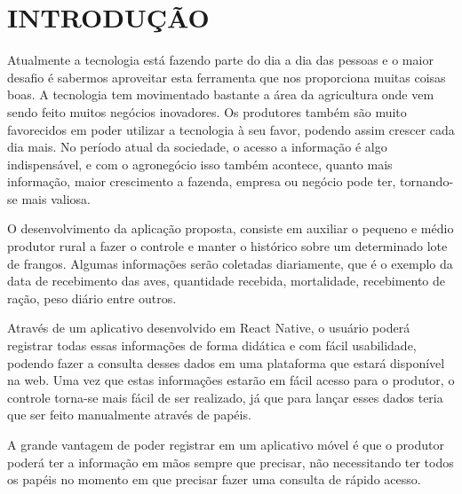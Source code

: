 
\chapter{INTRODUÇÃO}
\label{chap:introducao}


Atualmente a tecnologia está fazendo parte do dia a dia das pessoas e o maior desafio é sabermos aproveitar esta ferramenta que nos proporciona muitas coisas boas. A tecnologia tem movimentado bastante a área da agricultura onde vem sendo feito muitos negócios inovadores. Os produtores também são muito favorecidos em poder utilizar a tecnologia à seu favor, podendo assim crescer cada dia mais. 
No período atual da sociedade, o acesso a informação é algo indispensável, e com o agronegócio isso também acontece, quanto mais informação, maior crescimento a fazenda, empresa ou negócio pode ter, tornando-se mais valiosa. 

O desenvolvimento da aplicação proposta, consiste em auxiliar o pequeno e médio produtor rural a fazer o controle e manter o histórico sobre um determinado lote de frangos. Algumas informações serão coletadas diariamente, que é o exemplo da data de recebimento das aves, quantidade recebida, mortalidade, recebimento de ração, peso diário entre outros. 

Através de um aplicativo desenvolvido em React Native, o usuário poderá registrar todas essas informações de forma didática e com fácil usabilidade, podendo fazer a consulta desses dados em uma plataforma que estará disponível na web.
Uma vez que estas informações estarão em fácil acesso para o produtor, o controle torna-se mais fácil de ser realizado, já que para lançar esses dados teria que ser feito manualmente através de papéis. 

A grande vantagem de poder registrar em um aplicativo móvel é que o produtor poderá ter a informação em mãos sempre que precisar, não necessitando ter todos os papéis no momento em que precisar fazer uma consulta de rápido acesso.
